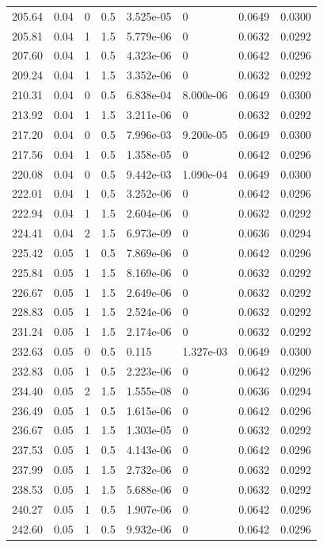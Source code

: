 \documentclass[preview]{standalone}
\begin{document}
{{{\begin{tabular}{L{1.2cm}C{1.2cm} C{0.3cm}C{0.5cm} C{1.4cm}C{1.4cm} C{1.4cm}C{1.4cm}}
  205.64  &  0.04  & 0     & 0.5 &  3.525e-05  & 0  & 0.0649 &  0.0300   \\ 
  205.81  &  0.04  & 1     & 1.5 &  5.779e-06  & 0  & 0.0632 &  0.0292   \\ 
  207.60  &  0.04  & 1     & 0.5 &  4.323e-06  & 0  & 0.0642 &  0.0296   \\ 
  209.24  &  0.04  & 1     & 1.5 &  3.352e-06  & 0  & 0.0632 &  0.0292   \\ 
  210.31  &  0.04  & 0     & 0.5 &  6.838e-04  & 8.000e-06  & 0.0649 &  0.0300   \\ 
  213.92  &  0.04  & 1     & 1.5 &  3.211e-06  & 0  & 0.0632 &  0.0292   \\ 
  217.20  &  0.04  & 0     & 0.5 &  7.996e-03  & 9.200e-05  & 0.0649 &  0.0300   \\ 
  217.56  &  0.04  & 1     & 0.5 &  1.358e-05  & 0  & 0.0642 &  0.0296   \\ 
  220.08  &  0.04  & 0     & 0.5 &  9.442e-03  & 1.090e-04  & 0.0649 &  0.0300   \\ 
  222.01  &  0.04  & 1     & 0.5 &  3.252e-06  & 0  & 0.0642 &  0.0296   \\ 
  222.94  &  0.04  & 1     & 1.5 &  2.604e-06  & 0  & 0.0632 &  0.0292   \\ 
  224.41  &  0.04  & 2     & 1.5 &  6.973e-09  & 0  & 0.0636 &  0.0294   \\ 
  225.42  &  0.05  & 1     & 0.5 &  7.869e-06  & 0  & 0.0642 &  0.0296   \\ 
  225.84  &  0.05  & 1     & 1.5 &  8.169e-06  & 0  & 0.0632 &  0.0292   \\ 
  226.67  &  0.05  & 1     & 1.5 &  2.649e-06  & 0  & 0.0632 &  0.0292   \\ 
  228.83  &  0.05  & 1     & 1.5 &  2.524e-06  & 0  & 0.0632 &  0.0292   \\ 
  231.24  &  0.05  & 1     & 1.5 &  2.174e-06  & 0  & 0.0632 &  0.0292   \\ 
  232.63  &  0.05  & 0     & 0.5 &  0.115  & 1.327e-03  & 0.0649 &  0.0300   \\ 
  232.83  &  0.05  & 1     & 0.5 &  2.223e-06  & 0  & 0.0642 &  0.0296   \\ 
  234.40  &  0.05  & 2     & 1.5 &  1.555e-08  & 0  & 0.0636 &  0.0294   \\ 
  236.49  &  0.05  & 1     & 0.5 &  1.615e-06  & 0  & 0.0642 &  0.0296   \\ 
  236.67  &  0.05  & 1     & 1.5 &  1.303e-05  & 0  & 0.0632 &  0.0292   \\ 
  237.53  &  0.05  & 1     & 0.5 &  4.143e-06  & 0  & 0.0642 &  0.0296   \\ 
  237.99  &  0.05  & 1     & 1.5 &  2.732e-06  & 0  & 0.0632 &  0.0292   \\ 
  238.53  &  0.05  & 1     & 1.5 &  5.688e-06  & 0  & 0.0632 &  0.0292   \\ 
  240.27  &  0.05  & 1     & 0.5 &  1.907e-06  & 0  & 0.0642 &  0.0296   \\ 
  242.60  &  0.05  & 1     & 0.5 &  9.932e-06  & 0  & 0.0642 &  0.0296   \\ 
\hline 
\end{tabular} 

}}}
\end{document}
